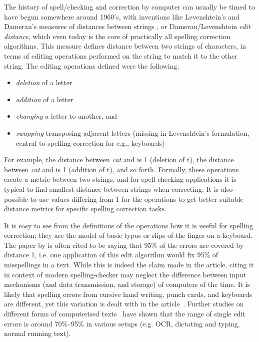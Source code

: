 \documentclass[officiallayout]{unihelcompling}
\newcommand\misspelt{\bgroup\markoverwith
{\textcolor{red}{\lower3.5pt\hbox{\sixly \char58}}}\ULon}
\begin{document}
The history of spell\-/checking and correction by computer can usually be timed
to have begun somewhere around 1960's, with inventions like Levenshtein's and
Damerau's measures of distances between strings
\citep{levenshtein1966binary,damerau1964technique}, or Damerau\-/Levenshtein
\emph{edit distance}, which even today is the core of practically all spelling
correction algorithms. This measure defines distance between two strings of
characters, in terms of editing operations performed on the string to match it
to the other string. The editing operations defined were the following:

\begin{itemize}
    \item \emph{deletion} of a letter
    \item \emph{addition} of a letter
    \item \emph{changing} a letter to another, and
    \item \emph{swapping} transposing adjacent letters (missing in
        Levenshtein's formulation, central to spelling correction for
        e.g., keyboards)
\end{itemize}

For example, the distance between \emph{cat} and \misspelt{ca} is 1 (deletion
of t), the distance between \emph{cat} and \misspelt{catt} is 1 (addition of
t), and so forth. Formally, these operations create a metric between two
strings, and for spell-checking applications it is typical to find smallest
distance between strings when correcting. It is also possible to use values
differing from 1 for the operations to get better suitable distance metrics
for specific spelling correction tasks.

It is easy to see from the definitions of the operations how it is useful
for spelling correction; they are the model of basic typos or slips of the
finger on a keyboard. The paper by \citet{damerau1964technique} is often cited
to be saying that 95\% of the errors are covered by distance 1, i.e. one
application of this edit algorithm would fix 95\% of misspellings in a text.
While this is indeed the claim made in the article, citing it in context of
modern spelling-checker may neglect the difference between input mechanisms
(and data transmission, and storage) of computers of the time. It is likely
that spelling errors from cursive hand writing, punch cards, and keyboards are
different, yet this variation is dealt with in the
article~\citep{damerau1964technique}. Further studies on different forms of
computerised texts~\citep{kukich1992techniques} have shown that the range of
single edit errors is around 70\%--95\% in various setups (e.g. OCR,
dictating and typing, normal running text).
\end{document}
